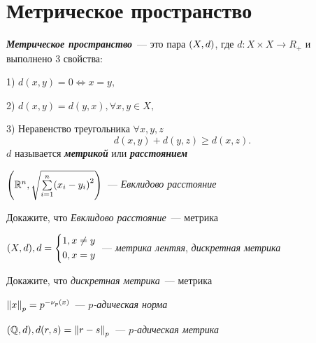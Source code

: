 \documentclass{article}
\begin{document}
    \section{Метрическое пространство}
    \begin{definition_boxed}
        \textit{\textbf{Метрическое пространство}}~--- это пара $\lr*{X, d}$, где $d : X \times X \rightarrow R_+$ и выполнено 3 свойства:

        1) $d(x, y) = 0 \Leftrightarrow x = y,$

        2) $d(x, y) = d(y, x), \forall x, y \in X,$

        3) Неравенство треугольника $\forall x, y, z$
        \[
            d(x, y) + d(y, z) \geqslant d(x, z).
        \]
        $d$ называется \textbf{\textit{метрикой}} или \textbf{\textit{расстоянием}}
    \end{definition_boxed}

    \begin{example}
        $\lr*{\R^n, \sqrt{\sum\limits_{i=1}^{n}\lr*{x_i - y_i}^2}}$~--- \textit{Евклидово расстояние}
    \end{example}

    \begin{task_boxed}
        Докажите, что \textit{Евклидово расстояние}~--- метрика
    \end{task_boxed}

    \begin{example}
        $\lr*{X, d}, d =
        \begin{cases*}
            1, x \neq y \\
            0, x = y
        \end{cases*}$~---
        \textit{метрика лентяя}, \textit{дискретная метрика}
    \end{example}

    \begin{task_boxed}
        Докажите, что \textit{дискретная метрика}~--- метрика
    \end{task_boxed}

    \begin{definition_boxed}
        $\norm*{x}_p = p ^ {-\nu_p(x)}$~--- \textit{$p$-адическая норма}
    \end{definition_boxed}

    \begin{example}
        $\lr*{\Q, d}, d(r, s) = \norm*{r - s}_p$~---
        \textit{$p$-адическая метрика}
    \end{example}
\end{document}
